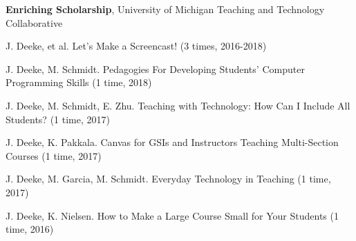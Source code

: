 \documentclass[10pt]{article}
\newenvironment{innerlist}[1][\enskip\textbullet]%
        {\begin{compactitem}[#1]}{\end{compactitem}}
\newcommand{\blankline}{\quad\pagebreak[2]}
\begin{document}
\textbf{Enriching Scholarship}, University of Michigan Teaching and Technology Collaborative 
\begin{innerlist}
\item J. Deeke, et al.  Let's Make a Screencast!  (3 times, 2016-2018)
\item J. Deeke, M. Schmidt.  Pedagogies For Developing Students' Computer Programming Skills (1 time, 2018)
\item J. Deeke, M. Schmidt, E. Zhu.  Teaching with Technology: How Can I Include All Students? (1 time, 2017)
\item J. Deeke, K. Pakkala.  Canvas for GSIs and Instructors Teaching Multi-Section Courses (1 time, 2017)
\item J. Deeke, M. Garcia, M. Schmidt.  Everyday Technology in Teaching (1 time, 2017)
\item J. Deeke, K. Nielsen.  How to Make a Large Course Small for Your Students (1 time, 2016)
\end{innerlist}
\blankline





\end{document}
